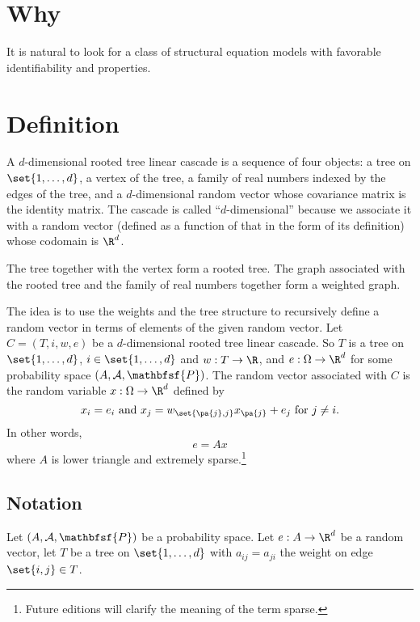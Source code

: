 

\section*{Why}

It is natural to look for a class of structural equation models with favorable identifiability and properties.

\section*{Definition}

A \t{$d$-dimensional rooted tree linear cascade} is a sequence of four objects: a tree on $\set{1, \dots , d}$, a vertex of the tree, a family of real numbers indexed by the edges of the tree, and a $d$-dimensional random vector whose covariance matrix is the identity matrix.
The cascade is called ``$d$-dimensional'' because we associate it with a random vector (defined as a function of that in the form of its definition) whose codomain is $\R ^d$.

The tree together with the vertex form a rooted tree.
The graph associated with the rooted tree and the family of real numbers together form a weighted graph.

The idea is to use the weights and the tree structure to recursively define a random vector in terms of elements of the given random vector.
Let $C = (T, i, w, e)$ be a $d$-dimensional rooted tree linear cascade.
So $T$ is a tree on $\set{1, \dots , d}$, $i \in \set{1, \dots , d}$ and $w: T \to \R $, and $e: \Omega  \to \R ^d$ for some probability space $(A, \mathcal{A} , \mathbfsf{P} )$.
The random vector associated with $C$ is the random variable $x: \Omega  \to \R ^d$ defined by
\[
x_i = e_i \text{ and } x_j = w_{\set{\pa{j}, j}}x_{\pa{j}} + e_{j} \text{ for } j \neq i.
\]
In other words,
\[
e = Ax
\]
where $A$ is lower triangle and extremely sparse.\footnote{Future editions will clarify the meaning of the term sparse.}

\subsection*{Notation}

Let $(A, \mathcal{A} , \mathbfsf{P} )$ be a probability space.
Let $e: A \to \R ^d$ be a random vector, let $T$ be a tree on $\set{1, \dots , d}$ with $a_{ij} = a_{ji}$ the weight on edge $\set{i, j} \in T$.
